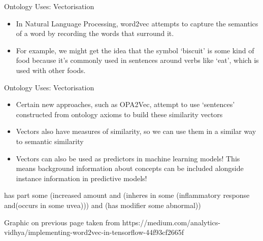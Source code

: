 \documentclass[aspectratio=169]{beamer} %
\begin{document}
\begin{frame}{Ontology Uses: Vectorisation}
  \begin{itemize}
    \item In Natural Language Processing, word2vec attempts to capture the semantics of a word by recording the words that surround it.
    \item For example, we might get the idea that the symbol `biscuit' is some kind of food because it's commonly used in sentences around verbs like `eat', which is used with other foods.
  \end{itemize}

\end{frame}

\begin{frame}{Ontology Uses: Vectorisation}

\begin{itemize}
  \item Certain new approaches, such as OPA2Vec, attempt to use `sentences' constructed from ontology axioms to build these similarity vectors
  \item Vectors also have measures of similarity, so we can use them in a similar way to semantic similarity
  \item Vectors can also be used as predictors in machine learning models! This means background information about concepts can be included alongside instance information in predictive models!
\end{itemize}

  has part some (increased amount and (inheres in some (inflammatory response and(occurs in some uvea))) and (has modifier some abnormal))

  \begin{minipage}[t][.2\textheight]{\textwidth}
\tiny{Graphic on previous page taken from https://medium.com/analytics-vidhya/implementing-word2vec-in-tensorflow-44f93cf2665f}
\vfill
\end{minipage}

\end{frame}
\end{document}
